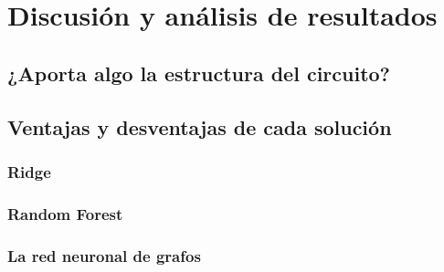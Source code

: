 \chapter{Discusión y análisis de resultados}
\label{cap:discusion}

%
%
%

\section{¿Aporta algo la estructura del circuito?}
\label{sec:aporta_discusion}

\section{Ventajas y desventajas de cada solución}
\label{sec:ventajas}
\subsection{Ridge}
\subsection{Random Forest}
\subsection{La red neuronal de grafos}

